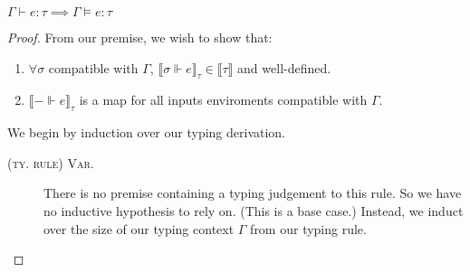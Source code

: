 \begin{theorem}
$\Gamma \vdash e : \tau \implies \Gamma \vDash e : \tau$
\end{theorem}
\begin{proof}
From our premise, we wish to show that:
  \begin{enumerate}
    \item $\forall \sigma$ compatible with $\Gamma$, $\llbracket \sigma \Vdash e
      \rrbracket_{\tau} \in \llbracket \tau \rrbracket$ and well-defined.
    \item $\llbracket - \Vdash e \rrbracket_{\tau}$ is a  map
      for all inputs enviroments compatible with $\Gamma$.
  \end{enumerate}
We begin by induction over our typing derivation. 
\begin{description}
  \item[\textsc{(ty. rule) Var.}] There is no premise containing a typing
    judgement to this rule. So we have no inductive hypothesis to rely on.
    (This is a base case.)
    Instead, we induct over the size of our typing context $\Gamma$ from our
    typing rule.
\end{description}
\end{proof}
